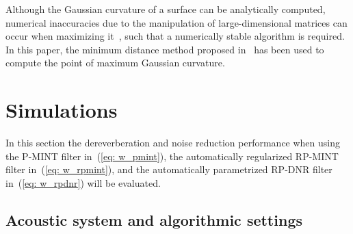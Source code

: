 \documentclass{aes60i}
\begin{document}
Although the Gaussian curvature of a surface can be analytically computed, numerical inaccuracies due to the manipulation of large-dimensional matrices can occur when maximizing it~\cite{Belge_IP_2002}, such that a numerically stable algorithm is required.
In this paper, the minimum distance method proposed in~\cite{Belge_IP_2002} has been used to compute the point of maximum Gaussian curvature. 

\section{Simulations}

In this section the dereverberation and noise reduction performance when using the P-MINT filter in~(\ref{eq: w_pmint}), the automatically regularized RP-MINT filter in~(\ref{eq: w_rpmint}), and the automatically parametrized RP-DNR filter in~(\ref{eq: w_rpdnr}) will be evaluated.

\subsection{Acoustic system and algorithmic settings}
\end{document}
